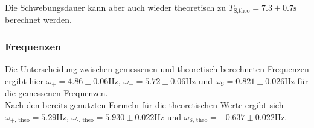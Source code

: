             \noindent Die Schwebungsdauer kann aber auch wieder theoretisch zu $T_{\text{S,theo}} = 7.3 \pm 0.7 \si{\second}$ berechnet werden.

        \subsubsection{Frequenzen}

            \noindent Die Unterscheidung zwischen gemessenen und theoretisch berechneten Frequenzen ergibt hier 
            $\omega_{+} = 4.86 \pm 0.06 \si{\hertz}$, $\omega_{-} = 5.72 \pm 0.06 \si{\hertz}$ und 
            $ \omega_{\text{S}}= 0.821 \pm 0.026 \si{\hertz}$ für die gemessenen Frequenzen.\\
            Nach den bereits genutzten Formeln für die theoretischen Werte ergibt sich
            $\omega_\text{+, theo} = 5.29 \si{\hertz}$, $\omega_\text{-, theo} = 5.930 \pm 0.022 \si{\hertz}$ 
            und $\omega_\text{S, theo} = -0.637 \pm 0.022 \si{\hertz}$.


